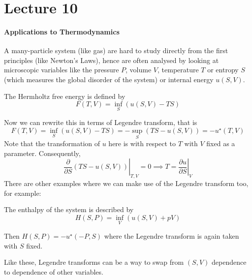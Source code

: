 \documentclass{article}
\begin{document}
\part*{Lecture 10}
\subsection{Applications to Thermodynamics}
A many-particle system (like gas) are hard to study directly from the first principles (like Newton's Laws), hence are often analysed by looking at microscopic variables like the pressure $P$, volume $V$, temperature $T$ or entropy $S$ (which measures the global disorder of the system) or internal energy $u(S,V)$.
\begin{definition}
    The Hermholtz free energy is defined by
    $$F(T,V)=\inf_{S}(u(S,V)-TS)$$
\end{definition}
Now we can rewrite this in terms of Legendre transform, that is
$$F(T,V)=\inf_{S}(u(S,V)-TS)=-\sup_{S}(TS-u(S,V))=-u^\star(T,V)$$
Note that the transformation of $u$ here is with respect to $T$ with $V$ fixed as a parameter.
Consequently,
$$\left.\frac{\partial}{\partial S}(TS-u(S,V))\right|_{T,V}=0\implies T=\left.\frac{\partial u}{\partial S}\right|_V$$
There are other examples where we can make use of the Legendre transform too, for example:
\begin{definition}
    The enthalpy of the system is described by
    $$H(S,P)=\inf_{V}(u(S,V)+pV)$$
\end{definition}
Then $H(S,P)=-u^\star(-P,S)$ where the Legendre transform is again taken with $S$ fixed.

Like these, Legendre transforms can be a way to swap from $(S,V)$ dependence to dependence of other variables.
\end{document}
